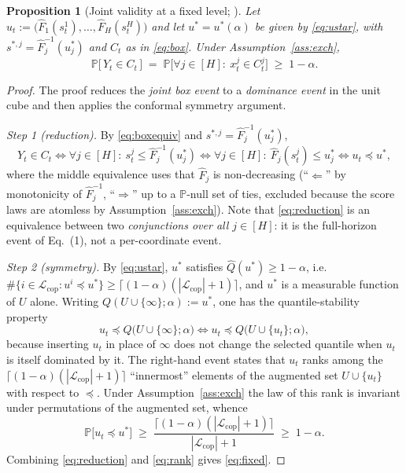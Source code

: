 \documentclass[11pt]{article}
\newtheorem{proposition}[theorem]{Proposition}
\theoremstyle{definition}
\theoremstyle{remark}
\newcommand{\PR}{\mathbb{P}}
\newcommand{\Lcop}{\mathcal{L}_{\mathrm{cop}}}
\newcommand{\horizon}{[H]}
\begin{document}
\begin{proposition}[Joint validity at a fixed level; \cite{sunyu2024}]
\label{prop:fixed}
Let $u_t:=\bigl(\widehat{F}_1(s_t^{1}),\dots,\widehat{F}_H(s_t^{H})\bigr)$ and
let $u^{*}=u^{*}(\alpha)$ be given by \eqref{eq:ustar}, with
$s^{*,j}=\widehat{F}_j^{-1}(u_j^{*})$ and $C_t$ as in \eqref{eq:box}. Under
Assumption~\ref{ass:exch},
\begin{equation}
  \PR\bigl[\,Y_t\in C_t\,\bigr]
  \;=\;\PR\bigl[\forall j\in\horizon:\ x_t^{j}\in C_t^{j}\bigr]
  \;\ge\;1-\alpha .
  \label{eq:fixed}
\end{equation}
\end{proposition}

\begin{proof}
The proof reduces the \emph{joint box event} to a \emph{dominance event} in the
unit cube and then applies the conformal symmetry argument.

\emph{Step 1 (reduction).} By \eqref{eq:boxequiv} and
$s^{*,j}=\widehat{F}_j^{-1}(u_j^{*})$,
\begin{equation}
  Y_t\in C_t
  \iff \forall j\in\horizon:\ s_t^{j}\le\widehat{F}_j^{-1}(u_j^{*})
  \iff \forall j\in\horizon:\ \widehat{F}_j(s_t^{j})\le u_j^{*}
  \iff u_t\preceq u^{*},
  \label{eq:reduction}
\end{equation}
where the middle equivalence uses that $\widehat{F}_j$ is non-decreasing
(``$\Leftarrow$'' by monotonicity of $\widehat{F}_j^{-1}$, ``$\Rightarrow$'' up
to a $\PR$-null set of ties, excluded because the score laws are atomless by
Assumption~\ref{ass:exch}). Note that \eqref{eq:reduction} is an equivalence
between two \emph{conjunctions over all $j\in\horizon$}: it is the
full-horizon event of Eq.~(1), not a per-coordinate event.

\emph{Step 2 (symmetry).} By \eqref{eq:ustar}, $u^{*}$ satisfies
$\widehat{Q}(u^{*})\ge1-\alpha$, i.e.\
$\#\{i\in\Lcop: u^{i}\preceq u^{*}\}\ge\lceil(1-\alpha)(|\Lcop|+1)\rceil$, and
$u^{*}$ is a measurable function of $U$ alone. Writing
$Q(U\cup\{\boldsymbol{\infty}\};\alpha):=u^{*}$, one has the quantile-stability
property
\[
  u_t\preceq Q\bigl(U\cup\{\boldsymbol{\infty}\};\alpha\bigr)
  \iff
  u_t\preceq Q\bigl(U\cup\{u_t\};\alpha\bigr),
\]
because inserting $u_t$ in place of $\boldsymbol{\infty}$ does not change the
selected quantile when $u_t$ is itself dominated by it. The right-hand event
states that $u_t$ ranks among the
$\lceil(1-\alpha)(|\Lcop|+1)\rceil$ ``innermost'' elements of the augmented
set $U\cup\{u_t\}$ with respect to $\preceq$. Under
Assumption~\ref{ass:exch} the law of this rank is invariant under permutations
of the augmented set, whence
\begin{equation}
  \PR\bigl[u_t\preceq u^{*}\bigr]
  \;\ge\;\frac{\bigl\lceil(1-\alpha)(|\Lcop|+1)\bigr\rceil}{|\Lcop|+1}
  \;\ge\;1-\alpha .
  \label{eq:rank}
\end{equation}
Combining \eqref{eq:reduction} and \eqref{eq:rank} gives \eqref{eq:fixed}.
\end{proof}
\end{document}
